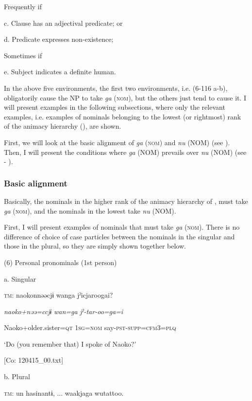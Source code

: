   Frequently if

  c.  Clause has an adjectival predicate; or

  d.  Predicate expresses non-existence;

  Sometimes if

  e.  Subject indicates a definite human.

In the above five environments, the first two environments, i.e. (6-116 a-b), obligatorily cause the NP to take \textit{ga} (\textsc{nom}), but the others just tend to cause it. I will present examples in the following subsections, where only the relevant examples, i.e. examples of nominals belonging to the lowest (or rightmost) rank of the animacy hierarchy (), are shown.

  First, we will look at the basic alignment of \textit{ga} (\textsc{nom}) and \textit{nu} (NOM) (see ). Then, I will present the conditions where \textit{ga} (NOM) prevails over \textit{nu} (NOM) (see  - ).

\subsubsection{Basic alignment}

Basically, the nominals in the higher rank of the animacy hierarchy of , must take \textit{ga} (\textsc{nom}), and the nominals in the lowest take \textit{nu} (NOM).

First, I will present examples of nominals that must take \textit{ga} (\textsc{nom}). There is no difference of choice of case particles between the nominals in the singular and those in the plural, so they are simply shown together below.

(6)  Personal pronominals (1st person)

  a.  Singular

    \textsc{tm}:  naokonnəəcjɨ  wanga  jˀicjaroogai?

      \textit{naoko+nəə=ccjɨ}  \textit{wan=ga}  \textit{jˀ-tar-oo=ga=i}

      Naoko+older.sister=\textsc{qt}  1\textsc{sg}=\textsc{nom}  say-\textsc{pst}-\textsc{supp}=\textsc{cfm}3=\textsc{plq}

      ‘Do (you remember that) I spoke of Naoko?’

      [Co: 120415\_00.txt]

  b.  Plural

    \textsc{tm}:  un  hasinantɨ, ...  waakjaga  wutattoo.

